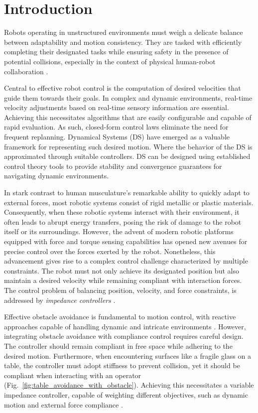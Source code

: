 \section{Introduction}
Robots operating in unstructured environments must weigh a delicate balance between adaptability and motion consistency. They are tasked with efficiently completing their designated tasks while ensuring safety in the presence of potential collisions, especially in the context of physical human-robot collaboration \parencite{ajoudani2018progress}.

Central to effective robot control is the computation of desired velocities that guide them towards their goals. In complex and dynamic environments, real-time velocity adjustments based on real-time sensory information are essential. Achieving this necessitates algorithms that are easily configurable and capable of rapid evaluation. As such, closed-form control laws eliminate the need for frequent replanning. Dynamical Systems (DS) have emerged as a valuable framework for representing such desired motion. Where the behavior of the DS is approximated through suitable controllers. DS can be designed using established control theory tools to provide stability and convergence guarantees for navigating dynamic environments.

In stark contrast to human musculature's remarkable ability to quickly adapt to external forces, most robotic systems consist of rigid metallic or plastic materials. Consequently, when these robotic systems interact with their environment, it often leads to abrupt energy transfers, posing the risk of damage to the robot itself or its surroundings. However, the advent of modern robotic platforms equipped with force and torque sensing capabilities has opened new avenues for precise control over the forces exerted by the robot.
Nonetheless, this advancement gives rise to a complex control challenge characterized by multiple constraints. The robot must not only achieve its designated position but also maintain a desired velocity while remaining compliant with interaction forces. The control problem of balancing position, velocity, and force constraints, is addressed by \textit{impedance controllers} \parencite{takegaki1981new, hogan1984impedance}.

Effective obstacle avoidance is fundamental to motion control, with reactive approaches capable of handling dynamic and intricate environments \parencite{huber2019avoidance, huber2022avoiding}. However, integrating obstacle avoidance with compliance control requires careful design. The controller should remain compliant in free space while adhering to the desired motion. Furthermore, when encountering surfaces like a fragile glass on a table, the controller must adopt stiffness to prevent collision, yet it should be compliant when interacting with an operator (Fig.~\ref{fig:table_avoidance_with_obstacle}). Achieving this necessitates a variable impedance controller, capable of weighting different objectives, such as dynamic motion and external force compliance \parencite{kronander2015passive}.

